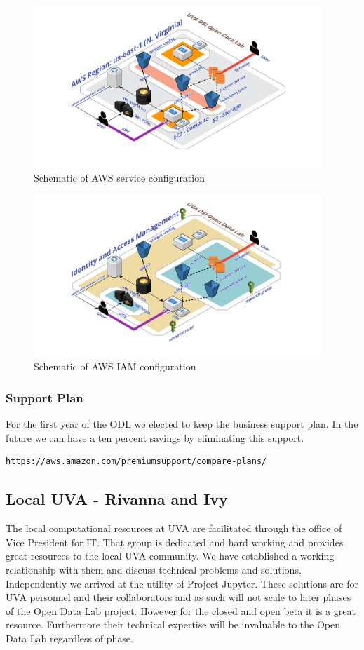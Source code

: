 \begin{figure}[!hbtp]
\includegraphics[width=0.97\textwidth]{images/odl-diagram.png}
\caption{Schematic of AWS service configuration\label{fg:aws}}
\end{figure}
\begin{figure}[!hbtp]
\includegraphics[width=0.97\textwidth]{images/odl-iam.png}
\caption{Schematic of AWS IAM configuration\label{fg:iam}}
\end{figure}



\subsubsection{Support Plan}
For the first year of the ODL we elected to keep the business support plan. In the future we can have a ten percent savings by eliminating this support.
\begin{verbatim}
https://aws.amazon.com/premiumsupport/compare-plans/
\end{verbatim}

\subsection{Local UVA - Rivanna and Ivy}
The local computational resources at UVA are facilitated through the office of Vice President for IT. That group is dedicated and hard working and provides great resources to the local UVA community. We have established a working relationship with them and discuss technical problems and solutions. Independently we arrived at the utility of Project Jupyter.
These solutions are for UVA personnel and their collaborators and as such will not scale to later phases of the Open Data Lab project. However for the closed and open beta it is a great resource. Furthermore their technical expertise will be invaluable to the Open Data Lab regardless of phase.

